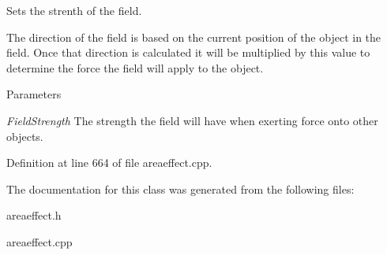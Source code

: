 Sets the strenth of the field. 

The direction of the field is based on the current position of the object in the field. Once that direction is calculated it will be multiplied by this value to determine the force the field will apply to the object. 
\begin{DoxyParams}{Parameters}
\item[{\em FieldStrength}]The strength the field will have when exerting force onto other objects. \end{DoxyParams}


Definition at line 664 of file areaeffect.cpp.



The documentation for this class was generated from the following files:\begin{DoxyCompactItemize}
\item 
areaeffect.h\item 
areaeffect.cpp\end{DoxyCompactItemize}
